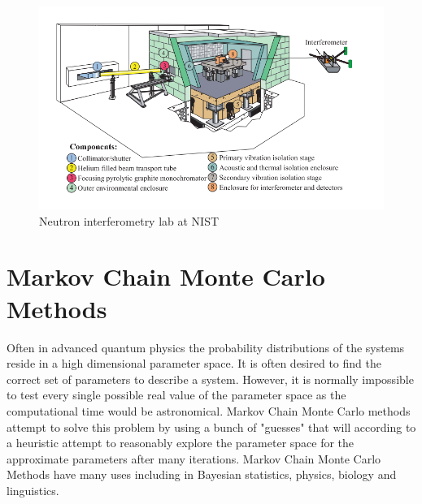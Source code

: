\begin{figure}[ht!]
\centering
\includegraphics[scale=1.0]{Figures/neutroninterferometer.png}
\caption{Neutron interferometry lab at NIST \cite{dimaThesis}}
\label{fig:neutroninterferometerlab}
\end{figure}
\section{Markov Chain Monte Carlo Methods}
Often in advanced quantum physics the probability distributions of the systems reside in a high dimensional parameter space. It is often desired to find the correct set of parameters to describe a system. However, it is normally impossible to test every single possible real value of the parameter space as the computational time would be astronomical. Markov Chain Monte Carlo methods attempt to solve this problem by using a bunch of "guesses" that will according to a heuristic attempt to reasonably explore the parameter space for the approximate parameters after many iterations.  Markov Chain Monte Carlo Methods have many uses including in Bayesian statistics, physics, biology and linguistics.\cite{mcmc}

